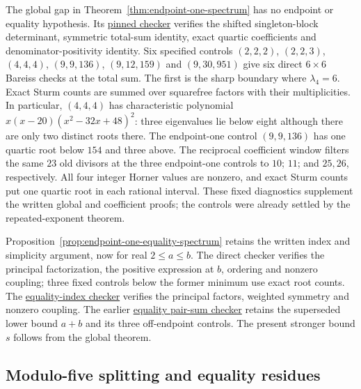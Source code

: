 The global gap in Theorem~\ref{thm:endpoint-one-spectrum} has no endpoint
or equality hypothesis. Its
\href{https://github.com/the-omega-institute/ideal-intersection-laplacian/blob/4a451ac51055c6d04926967749196f12ac8e49c8/scripts/check_total_sum_spectral_gap.py}{pinned checker}
verifies the shifted singleton-block determinant, symmetric total-sum
identity, exact quartic coefficients and denominator-positivity identity.
Six specified controls $(2,2,2)$, $(2,2,3)$, $(4,4,4)$, $(9,9,136)$,
$(9,12,159)$ and $(9,30,951)$ give six direct $6\times6$ Bareiss
checks at the total sum. The first is the sharp boundary where
$\lambda_4=6$. Exact Sturm counts are summed
over squarefree factors with their multiplicities. In particular,
$(4,4,4)$ has characteristic polynomial
$x(x-20)(x^2-32x+48)^2$: three eigenvalues lie below eight although
there are only two distinct roots there. The endpoint-one control
$(9,9,136)$ has one quartic root below $154$ and three above.
The reciprocal coefficient window filters the same $23$ old divisors
at the three endpoint-one controls to $10$; $11$; and $25,26$,
respectively. All four integer Horner values are nonzero, and exact
Sturm counts put one quartic root in each rational interval.
These fixed diagnostics supplement the written global and coefficient proofs;
the controls were already settled by the repeated-exponent theorem.

Proposition~\ref{prop:endpoint-one-equality-spectrum} retains the written
index and simplicity argument, now for real $2\leq a\leq b$.
The direct checker  verifies
the principal factorization, the positive expression at $b$, ordering
and nonzero coupling; three fixed controls below the former minimum
use exact root counts. The
\href{https://github.com/the-omega-institute/ideal-intersection-laplacian/blob/d3fa3478193f34777a88b970da8f0763ce177c38/scripts/check_endpoint_one_equality_root.py}{equality-index checker}
verifies the principal factors, weighted symmetry and nonzero coupling.
The earlier
\href{https://github.com/the-omega-institute/ideal-intersection-laplacian/blob/9e98266eb279a31b7282cea17fca3f5af6d9410f/scripts/check_endpoint_one_equality_second_root.py}{equality pair-sum checker}
retains the superseded lower bound $a+b$ and its three off-endpoint
controls. The present stronger bound $s$ follows from the global theorem.

\subsection{Modulo-five splitting and equality residues}

